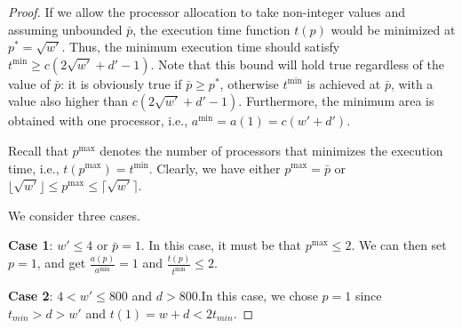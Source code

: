 \documentclass{article}
\begin{document}
\begin{proof}
If we allow the processor allocation to take non-integer values and assuming unbounded $\bar{p}$, the execution time function $t(p)$ would be minimized at $p^*=\sqrt{w'}$. Thus, the minimum execution time should satisfy $t^{\min}\ge c(2\sqrt{w'}+d'-1)$. Note that this bound will hold true regardless of the value of $\bar{p}$: it is obviously true if $\bar{p} \ge p^*$, otherwise $t^{\min}$ is achieved at $\bar{p}$, with a value also higher than $c(2\sqrt{w'}+d'-1)$.
Furthermore, the minimum area is obtained with one processor, i.e., $a^{\min} = a(1) = c(w'+d')$.

Recall that $p^{\max}$ denotes the number of processors that minimizes the execution time, i.e., $t(p^{\max}) = t^{\min}$. Clearly, we have either $p^{\max}=\bar{p}$ or $\lfloor \sqrt{w'} \rfloor \leq p^{\max} \leq \lceil \sqrt{w'} \rceil$.

We consider three cases.

\textbf{Case 1}: $w'\leq 4$ or $\bar{p}=1$. In this case, it must be that $p^{\max}\leq 2$. We can then set $p = 1$, and get $\frac{a(p)}{a^{\min}}=1$ and $\frac{t(p)}{t^{\min}} \leq 2$.

\textbf{Case 2}: $4<w'\leq 800$ and $d>800$.In this case, we chose $p=1$ since $t_{min}>d>w'$ and $t(1)=w+d<2t_{min}$.




\end{proof}
\end{document}
